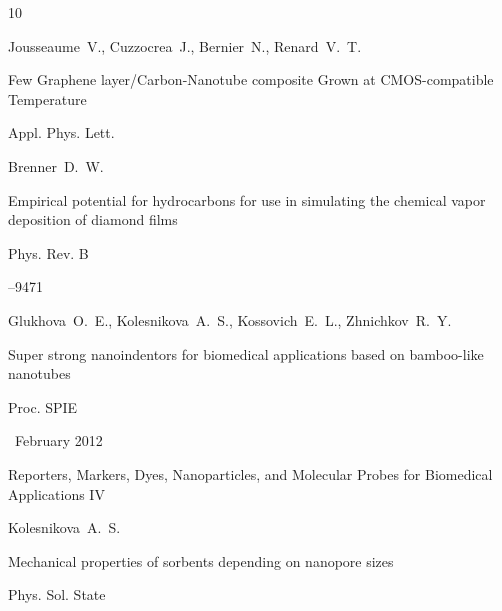 \begin{thebibliography}{10}

\by Jousseaume~V., Cuzzocrea~J., Bernier~N., Renard~V.~T.

\paper Few Graphene layer/Carbon-Nanotube composite Grown at CMOS-compatible Temperature

\jour Appl. Phys. Lett.










\by Brenner~D.~W.

\paper Empirical potential for hydrocarbons for use in simulating the chemical vapor deposition of diamond films

\jour Phys. Rev. B



--9471







\by Glukhova~O.~E., Kolesnikova~A.~S., Kossovich~E.~L., Zhnichkov~R.~Y.

\paper Super strong nanoindentors for biomedical applications based on bamboo-like nanotubes

\jour Proc. SPIE 


~February 2012

\volinfo Reporters, Markers, Dyes, Nanoparticles, and Molecular Probes for Biomedical Applications IV 









\by Kolesnikova~A.~S.

\paper Mechanical properties of sorbents depending on nanopore sizes

\jour Phys. Sol. State




\end{thebibliography}
